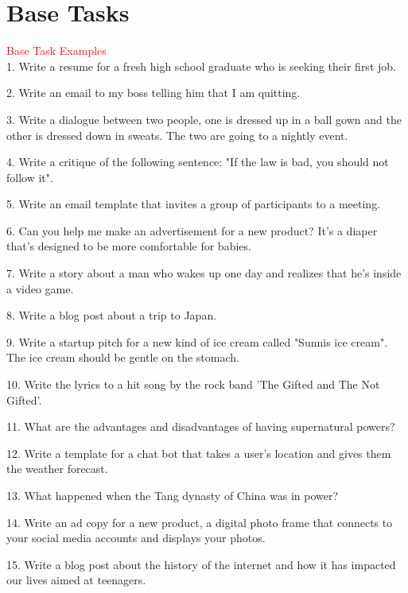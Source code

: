 \onecolumn
\clearpage
\section{Base Tasks}\label{app:base_tasks}

\begin{figure*}[h]
    \small
    \begin{tcolorbox}[colframe=white, left=3mm, right=3mm]
    \textcolor{red}{Base Task Examples} \\

1. Write a resume for a fresh high school graduate who is seeking their first job.

2. Write an email to my boss telling him that I am quitting.

3. Write a dialogue between two people, one is dressed up in a ball gown and the other is dressed down in sweats. The two are going to a nightly event.

4. Write a critique of the following sentence: "If the law is bad, you should not follow it".

5. Write an email template that invites a group of participants to a meeting.

6. Can you help me make an advertisement for a new product? It's a diaper that's designed to be more comfortable for babies.

7. Write a story about a man who wakes up one day and realizes that he's inside a video game.

8. Write a blog post about a trip to Japan.

9. Write a startup pitch for a new kind of ice cream called "Sunnis ice cream". The ice cream should be gentle on the stomach.

10. Write the lyrics to a hit song by the rock band 'The Gifted and The Not Gifted'.

11. What are the advantages and disadvantages of having supernatural powers?

12. Write a template for a chat bot that takes a user's location and gives them the weather forecast.

13. What happened when the Tang dynasty of China was in power?

14. Write an ad copy for a new product, a digital photo frame that connects to your social media accounts and displays your photos.

15. Write a blog post about the history of the internet and how it has impacted our lives aimed at teenagers.


\end{tcolorbox}
\end{figure*}
